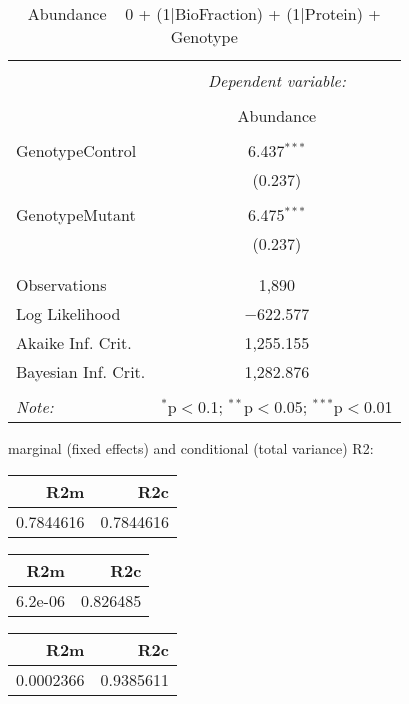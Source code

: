 \documentclass[11pt]{report}
\begin{document}
\begin{table}[!htbp] \centering 
  \caption{Abundance ~ 0 + (1|BioFraction) + (1|Protein) + Genotype} 
  \label{} 
\begin{tabular}{@{\extracolsep{5pt}}lc} 
\\[-1.8ex]\hline 
\hline \\[-1.8ex] 
 & \multicolumn{1}{c}{\textit{Dependent variable:}} \\ 
\cline{2-2} 
\\[-1.8ex] & Abundance \\ 
\hline \\[-1.8ex] 
 GenotypeControl & 6.437$^{***}$ \\ 
  & (0.237) \\ 
  & \\ 
 GenotypeMutant & 6.475$^{***}$ \\ 
  & (0.237) \\ 
  & \\ 
\hline \\[-1.8ex] 
Observations & 1,890 \\ 
Log Likelihood & $-$622.577 \\ 
Akaike Inf. Crit. & 1,255.155 \\ 
Bayesian Inf. Crit. & 1,282.876 \\ 
\hline 
\hline \\[-1.8ex] 
\textit{Note:}  & \multicolumn{1}{r}{$^{*}$p$<$0.1; $^{**}$p$<$0.05; $^{***}$p$<$0.01} \\ 
\end{tabular} 
\end{table} 
marginal (fixed effects) and conditional (total variance) R2:

\begin{tabular}{r|r}
\hline
R2m & R2c\\
\hline
0.7844616 & 0.7844616\\
\hline
\end{tabular}

\begin{tabular}{r|r}
\hline
R2m & R2c\\
\hline
6.2e-06 & 0.826485\\
\hline
\end{tabular}

\begin{tabular}{r|r}
\hline
R2m & R2c\\
\hline
0.0002366 & 0.9385611\\
\hline
\end{tabular}
\end{document}
